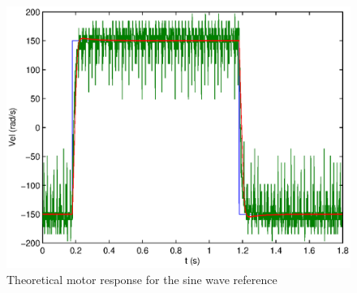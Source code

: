 \begin{center}
\begin{figure}[ht]
 \includegraphics[width=\linewidth]{fig/step_PI_speed.eps}
 \caption{Theoretical motor response for the sine wave reference}
 \label{step_PI_speed}
\end{figure}
\end{center}


